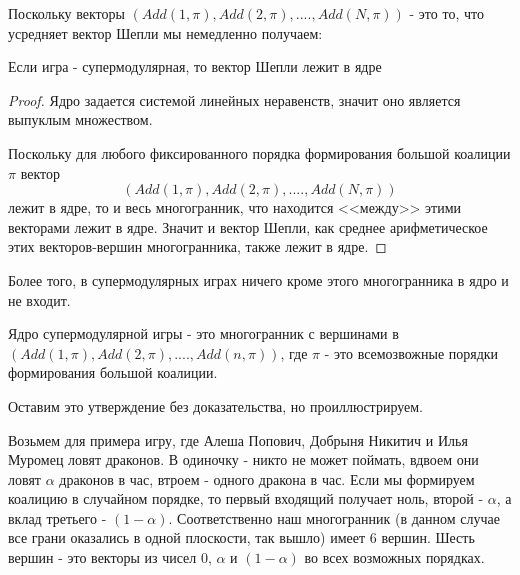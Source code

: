 Поскольку векторы $(Add(1,\pi),Add(2,\pi),....,Add(N,\pi))$ - это то, что усредняет вектор Шепли мы немедленно получаем:


\begin{myth}
Если игра - супермодулярная, то вектор Шепли лежит в ядре
\end{myth}
\begin{proof}
Ядро задается системой линейных неравенств, значит оно является выпуклым множеством. 

Поскольку для любого фиксированного порядка формирования большой коалиции $\pi$ вектор 
\begin{equation}
(Add(1,\pi),Add(2,\pi),....,Add(N,\pi))
\end{equation}
лежит в ядре, то и весь многогранник, что находится <<между>> этими векторами лежит в ядре. Значит и вектор Шепли, как среднее арифметическое этих векторов-вершин многогранника, также лежит в ядре.
\end{proof}

Более того, в супермодулярных играх ничего кроме этого многогранника в ядро и не входит.

\begin{myth}
Ядро супермодулярной игры - это многогранник  с вершинами в $(Add(1,\pi),Add(2,\pi),....,Add(n,\pi))$, где $\pi$ - это всемозвожные порядки формирования большой коалиции.
\end{myth}

Оставим это утверждение без доказательства, но проиллюстрируем. 

Возьмем для примера игру, где Алеша Попович, Добрыня Никитич и Илья Муромец ловят драконов. В одиночку - никто не может поймать, вдвоем они ловят $\alpha$ драконов в час, втроем - одного дракона в час. Если мы формируем коалицию в случайном порядке, то первый входящий получает ноль, второй - $\alpha$, а вклад третьего - $(1-\alpha)$. Соответственно наш многогранник (в данном случае все грани оказались в одной плоскости, так вышло) имеет 6 вершин. Шесть вершин - это векторы из чисел 0, $\alpha$ и $(1-\alpha)$ во всех возможных порядках.



